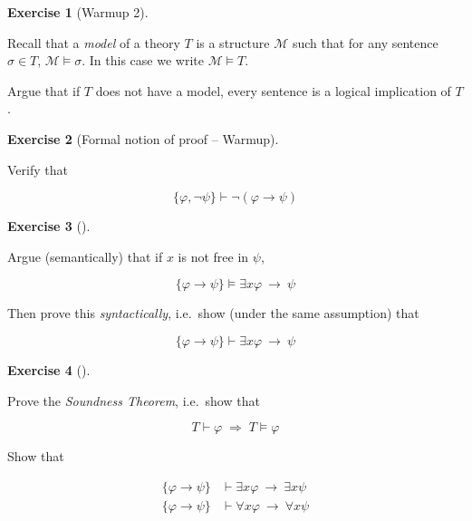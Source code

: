 \documentclass[
]{article}
\theoremstyle{definition}
\newtheorem{exercise}{Exercise}[section]
\theoremstyle{remark}
\begin{document}
\begin{exercise}[Warmup 2]\protect\hypertarget{exr-}{}\label{exr-}

\hfill\break
Recall that a \emph{model} of a theory \(T\) is a structure
\(\mathcal{M}\) such that for any sentence \(\sigma \in T\),
\(\mathcal{M} \models \sigma\). In this case we write
\(\mathcal{M} \models T\).

Argue that if \(T\) does not have a model, every sentence is a logical
implication of \(T\).

\end{exercise}

\begin{exercise}[Formal notion of proof --
Warmup]\protect\hypertarget{exr-}{}\label{exr-}

\hfill\break
Verify that

\[\{\varphi, \neg \psi\} \vdash \neg(\varphi \to \psi)\]

\end{exercise}

\begin{exercise}[]\protect\hypertarget{exr-}{}\label{exr-}

\hfill\break
Argue (semantically) that if \(x\) is not free in \(\psi\),

\[\{\varphi \to \psi\} \models \exists x \varphi \: \to \: \psi\]

Then prove this \emph{syntactically}, i.e.~show (under the same
assumption) that

\[\{\varphi \to \psi\} \vdash \exists x \varphi \: \to \: \psi\]

\end{exercise}

\begin{exercise}[]\protect\hypertarget{exr-}{}\label{exr-}

\hfill\break
Prove the \emph{Soundness Theorem}, i.e.~show that

\[T \vdash \varphi \; \Rightarrow \; T \models \varphi\]

\end{exercise}

\begin{tcolorbox}[enhanced jigsaw, opacityback=0, breakable, bottomrule=.15mm, toprule=.15mm, toptitle=1mm, colframe=quarto-callout-important-color-frame, left=2mm, leftrule=.75mm, coltitle=black, colbacktitle=quarto-callout-important-color!10!white, opacitybacktitle=0.6, bottomtitle=1mm, rightrule=.15mm, arc=.35mm, title=\textcolor{quarto-callout-important-color}{\faExclamation}\hspace{0.5em}{Take-home problem}, colback=white, titlerule=0mm]

\hfill\break
Show that

\begin{align*}
\{\varphi \to \psi \} & \vdash \exists x \varphi \: \to \: \exists x \psi \\
\{\varphi \to \psi \} & \vdash \forall x \varphi \: \to \: \forall x \psi \\
\end{align*}

\end{tcolorbox}
\end{document}

